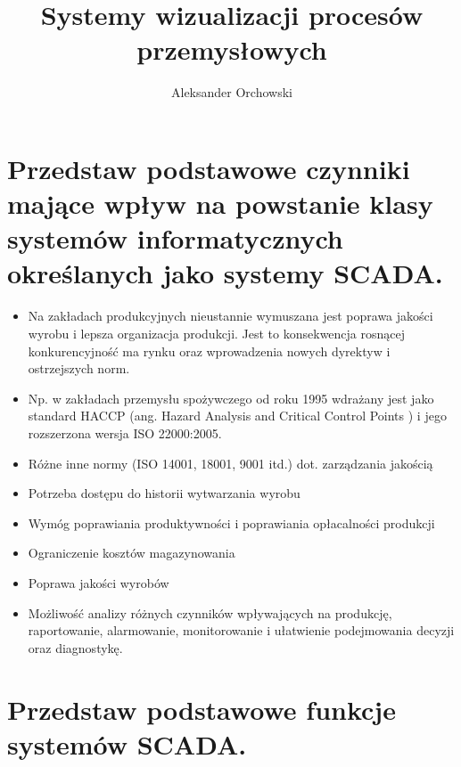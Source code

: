 \documentclass{article}
\title{Systemy wizualizacji procesów przemysłowych}
\author{Aleksander Orchowski}
\date{}
\begin{document}
	\tableofcontents
	\section{Przedstaw podstawowe czynniki mające wpływ na powstanie klasy systemów	informatycznych określanych jako systemy SCADA.	}	
	\begin{itemize}
		\item Na zakładach produkcyjnych nieustannie wymuszana jest poprawa
		jakości wyrobu i lepsza organizacja produkcji. Jest to konsekwencja rosnącej
		konkurencyjność ma rynku oraz wprowadzenia nowych dyrektyw i ostrzejszych norm.
		\item Np. w zakładach przemysłu spożywczego od roku 1995 wdrażany jest
		jako standard HACCP (ang. Hazard Analysis and Critical Control Points ) i
		jego rozszerzona wersja ISO 22000:2005.		
		\item Różne inne normy (ISO 14001, 18001, 9001 itd.) dot. zarządzania jakością		
		\item  Potrzeba dostępu do historii wytwarzania wyrobu
		\item Wymóg poprawiania produktywności i poprawiania opłacalności produkcji
		\item Ograniczenie kosztów magazynowania
		\item Poprawa jakości wyrobów
		\item Możliwość analizy różnych czynników wpływających na produkcję, raportowanie, alarmowanie, monitorowanie i ułatwienie podejmowania decyzji oraz diagnostykę.		
		
	\end{itemize}
	

	
	\section{Przedstaw podstawowe funkcje systemów SCADA.}
	
\end{document}
